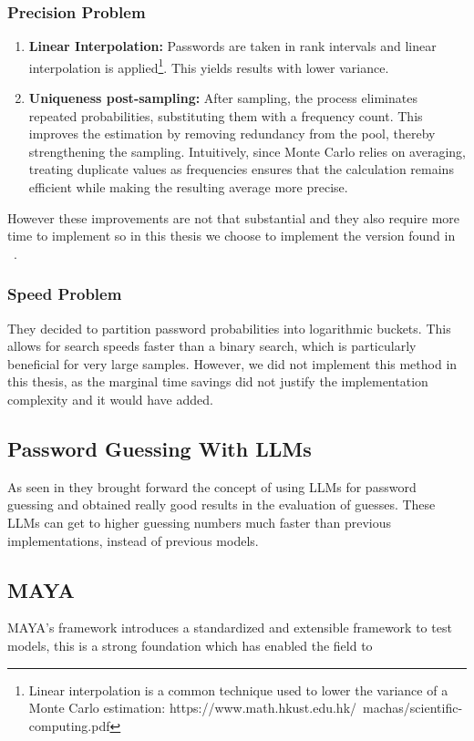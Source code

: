 \documentclass[english,noexaminfo,a4paper,oneside, binding = 0.6cm]{sapthesis}
\begin{document}
\subsubsection{Precision Problem}
\begin{enumerate}
  \item \textbf{Linear Interpolation:} Passwords are taken in rank intervals and linear interpolation is applied\footnote{Linear interpolation is a common technique used to lower the variance of a Monte Carlo estimation: https://www.math.hkust.edu.hk/~machas/scientific-computing.pdf}. This yields results with lower variance.
  \item \textbf{Uniqueness post-sampling:} After sampling, the process eliminates repeated probabilities, substituting them with a frequency count. This improves the estimation by removing redundancy from the pool, thereby strengthening the sampling. Intuitively, since Monte Carlo relies on averaging, treating duplicate values as frequencies ensures that the calculation remains efficient while making the resulting average more precise.
\end{enumerate}
However these improvements are not that substantial and they also require more time to implement so in this thesis we choose to implement the version found in ~\cite{ref:dellamico}.
\subsubsection{Speed Problem}
They decided to partition password probabilities into logarithmic buckets. This allows for search speeds faster than a binary search, which is particularly beneficial for very large samples. However, we did not implement this method in this thesis, as the marginal time savings did not justify the implementation complexity and it would have added.

\subsection{Password Guessing With LLMs}
As seen in \cite{ref:pwdguessllm} they brought forward the concept of using LLMs for password guessing and obtained really good results in the evaluation of guesses.
These LLMs can get to higher guessing numbers much faster than previous implementations, instead of previous models.
\label{sec:background}
\subsection{MAYA}
MAYA's framework introduces a standardized and extensible framework to test models, this is a strong foundation which has enabled the field to 
\end{document}

